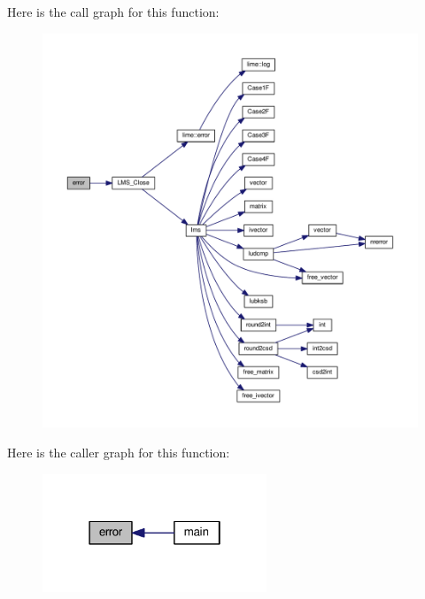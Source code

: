 Here is the call graph for this function\+:
\nopagebreak
\begin{figure}[H]
\begin{center}
\leavevmode
\includegraphics[width=350pt]{d8/d1e/gpio__example_8cpp_ad1a5ba420409525ff5ab1be86ac5e526_cgraph}
\end{center}
\end{figure}




Here is the caller graph for this function\+:
\nopagebreak
\begin{figure}[H]
\begin{center}
\leavevmode
\includegraphics[width=190pt]{d8/d1e/gpio__example_8cpp_ad1a5ba420409525ff5ab1be86ac5e526_icgraph}
\end{center}
\end{figure}


